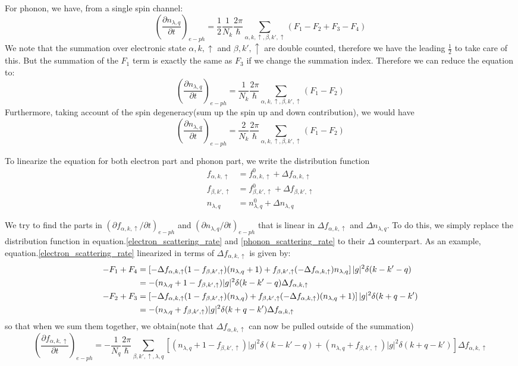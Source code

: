 \documentclass{article}
\newcommand{\pfrac}[2]{\frac{\partial #1}{\partial #2}}
\newcommand{\fak}{f_{\alpha,k,\uparrow}}
\newcommand{\fbk}{f_{\beta,k',\uparrow}}
\newcommand{\nlq}{n_{\lambda,q}}
\newcommand{\ak}{\alpha,k,\uparrow}
\newcommand{\bk}{\beta,k',\uparrow}
\newcommand{\ql}{\lambda,q}
\begin{document}
For phonon, we have, from a single spin channel:
\begin{equation}
    \left(\pfrac{\nlq}{t}\right)_{e-ph} = \frac{1}{2}\frac{1}{N_k}\frac{2\pi}{\hbar}\sum_{\ak,\bk}(F_1 - F_2 + F_3 - F_4)
\end{equation}
We note that the summation over electronic state $\ak$ and $\bk$ are double counted, therefore we have the leading $\frac{1}{2}$ to 
take care of this. But the summation of the $F_1$ term is exactly the same as $F_3$ if we change the summation index. Therefore we 
can reduce the equation to:
\begin{equation}
    \left(\pfrac{\nlq}{t}\right)_{e-ph} = \frac{1}{N_k}\frac{2\pi}{\hbar}\sum_{\ak,\bk}(F_1 - F_2)
\end{equation}
Furthermore, taking account of the spin degeneracy(sum up the spin up and down contribution), we would have
\begin{equation}
    \left(\pfrac{\nlq}{t}\right)_{e-ph} = \frac{2}{N_k}\frac{2\pi}{\hbar}\sum_{\ak,\bk}(F_1 - F_2) \label{phonon_scattering_rate}
\end{equation}

To linearize the equation for both electron part and phonon part, we write the distribution function
\begin{align}
    \fak &= \fak^0 + \Delta \fak \\
    \fbk &= \fbk^0 + \Delta \fbk \\
    \nlq &= \nlq^0 + \Delta \nlq 
\end{align}

We try to find the parts in $\left(\partial\fak / \partial t\right)_{e-ph}$ and $\left(\partial\nlq / \partial t\right)_{e-ph}$ that 
is linear in $\Delta \fak$ and $\Delta \nlq$. To do this, we simply replace the distribution function in equation.\ref{electron_scattering_rate}
and \ref{phonon_scattering_rate} to their $\Delta$ counterpart. As an example, equation.\ref{electron_scattering_rate} linearized in 
terms of $\Delta\fak$ is given by:
\begin{align}
    -F_1 + F_4 &= \left[ -\Delta\fak(1-\fbk)(\nlq+1) + \fbk(-\Delta\fak)\nlq \right]|g|^2\delta(k-k'-q) \notag \\
               &= -(\nlq+1-\fbk)|g|^2\delta(k-k'-q)\Delta\fak \\
    -F_2 + F_3 &= \left[ -\Delta\fak(1-\fbk)(\nlq) + \fbk(-\Delta\fak)(\nlq+1) \right]|g|^2\delta(k+q-k') \notag \\
               &= -(\nlq+\fbk)|g|^2\delta(k+q-k')\Delta\fak
\end{align}
so that when we sum them together, we obtain(note that $\Delta \fak$ can now be pulled outside of the summation)
\begin{equation}
    \left(\pfrac{\fak}{t}\right)_{e-ph} = - \frac{1}{N_q}\frac{2\pi}{\hbar}\sum_{\bk,\ql}\left[ (\nlq+1-\fbk)|g|^2\delta(k-k'-q) + (\nlq+\fbk)|g|^2\delta(k+q-k') \right]  \Delta\fak
\end{equation}
\end{document}
